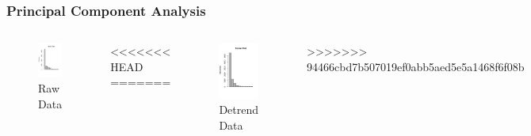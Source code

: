 \documentclass{beamer}
\begin{document}
\begin{frame}
\frametitle{Principal Component Analysis}
\begin{columns}
\column{2in}
\begin{table}[ht]
\begin{figure}
\centering
\includegraphics[height=0.7\textheight]{../img/Scree_plot1}
\caption{Raw Data}
\label{fig:screeplot1}
\end{figure}
\end{table}
<<<<<<< HEAD
=======
\column{2in}
\begin{table}[ht]
\begin{figure}
\centering
\includegraphics[height=0.7\textheight]{../img/Scree_plot2}
\caption{Detrend Data}
\label{fig:screeplot2}
\end{figure}
\end{table}

>>>>>>> 94466cbd7b507019ef0abb5aed5e5a1468f6f08b
\end{columns}
\end{frame}
\end{document}
